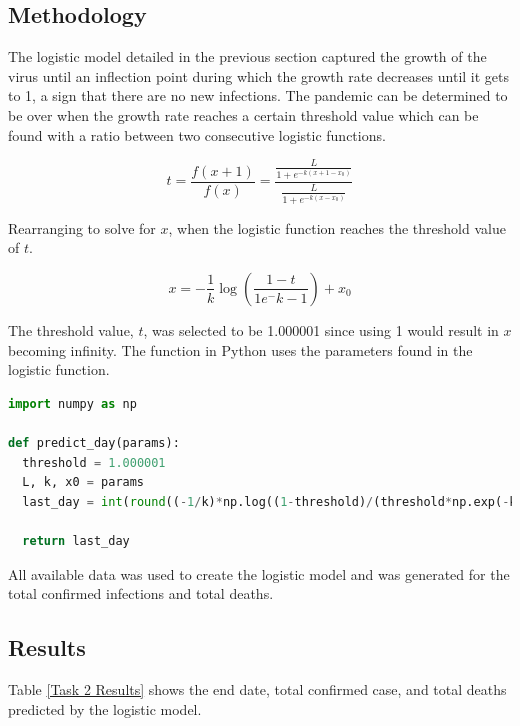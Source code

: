 \documentclass{homework}
\begin{document}
\subsection{Methodology}

The logistic model detailed in the previous section captured the growth of the virus until an inflection point during which the growth rate decreases until it gets to 1, a sign that there are no new infections. The pandemic can be determined to be over when the growth rate reaches a certain threshold value which can be found with a ratio between two consecutive logistic functions.

\begin{equation*}
  t = \frac{f(x+1)}{f(x)} = \frac{\frac{L}{1+e^{-k(x+1-x_0)}}}{\frac{L}{1+e^{-k(x-x_0)}}}
\end{equation*}

Rearranging to solve for $x$, when the logistic function reaches the threshold value of $t$.

\begin{equation}
  x = -\frac{1}{k}\log(\frac{1-t}{1e^-k-1}) + x_0
\end{equation}

The threshold value, $t$, was selected to be 1.000001 since using 1 would result in $x$ becoming infinity. The function in Python uses the parameters found in the logistic function.

\begin{lstlisting}[language=Python, caption={Predicting the Last Day}]
import numpy as np

def predict_day(params): 
  threshold = 1.000001
  L, k, x0 = params
  last_day = int(round((-1/k)*np.log((1-threshold)/(threshold*np.exp(-k)-1))+x0))

  return last_day
\end{lstlisting}

All available data was used to create the logistic model and was generated for the total confirmed infections and total deaths.

\newpage
\subsection{Results}

Table \ref{Task 2 Results} shows the end date, total confirmed case, and total deaths predicted by the logistic model.
\end{document}
